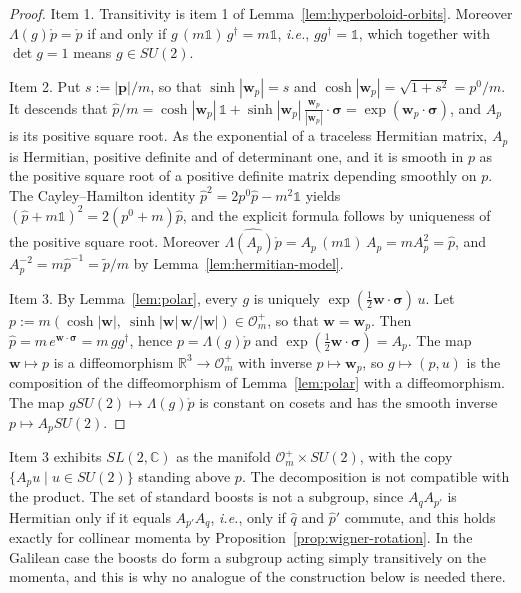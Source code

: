 \begin{proof}
	Item 1. Transitivity is item 1 of Lemma~\ref{lem:hyperboloid-orbits}. Moreover $\Lambda(g)\mathring{p}=\mathring{p}$ if and only if $g\,(m\mathbb{1})\,g^\dagger=m\mathbb{1}$, \textit{i.e.}, $gg^\dagger=\mathbb{1}$, which together with $\det g=1$ means $g\in SU(2)$.
	
	Item 2. Put $s:=|\mathbf{p}|/m$, so that $\sinh|\mathbf{w}_p|=s$ and $\cosh|\mathbf{w}_p|=\sqrt{1+s^2}=p^0/m$. It descends that $\hat{p}/m=\cosh|\mathbf{w}_p|\,\mathbb{1}+\sinh|\mathbf{w}_p|\,\tfrac{\mathbf{w}_p}{|\mathbf{w}_p|}\cdot\boldsymbol{\sigma}=\exp(\mathbf{w}_p\cdot\boldsymbol{\sigma})$, and $A_p$ is its positive square root. As the exponential of a traceless Hermitian matrix, $A_p$ is Hermitian, positive definite and of determinant one, and it is smooth in $p$ as the positive square root of a positive definite matrix depending smoothly on $p$. The Cayley--Hamilton identity $\hat{p}^2=2p^0\hat{p}-m^2\mathbb{1}$ yields $(\hat{p}+m\mathbb{1})^2=2(p^0+m)\hat{p}$, and the explicit formula follows by uniqueness of the positive square root. Moreover $\widehat{\Lambda(A_p)\mathring{p}}=A_p\,(m\mathbb{1})\,A_p=mA_p^2=\hat{p}$, and $A_p^{-2}=m\hat{p}^{-1}=\tilde{p}/m$ by Lemma~\ref{lem:hermitian-model}.
	
	Item 3. By Lemma~\ref{lem:polar}, every $g$ is uniquely $\exp(\tfrac12\mathbf{w}\cdot\boldsymbol{\sigma})\,u$. Let $p:=m(\cosh|\mathbf{w}|,\ \sinh|\mathbf{w}|\,\mathbf{w}/|\mathbf{w}|)\in\mathcal{O}_m^+$, so that $\mathbf{w}=\mathbf{w}_p$. Then $\hat{p}=m\,e^{\mathbf{w}\cdot\boldsymbol{\sigma}}=m\,gg^\dagger$, hence $p=\Lambda(g)\mathring{p}$ and $\exp(\tfrac12\mathbf{w}\cdot\boldsymbol{\sigma})=A_p$. The map $\mathbf{w}\mapsto p$ is a diffeomorphism $\mathbb{R}^3\to\mathcal{O}_m^+$ with inverse $p\mapsto\mathbf{w}_p$, so $g\mapsto(p,u)$ is the composition of the diffeomorphism of Lemma~\ref{lem:polar} with a diffeomorphism. The map $gSU(2)\mapsto\Lambda(g)\mathring{p}$ is constant on cosets and has the smooth inverse $p\mapsto A_pSU(2)$.
\end{proof}

\begin{remark}
	Item 3 exhibits $SL(2,\mathbb{C})$ as the manifold $\mathcal{O}_m^+\times SU(2)$, with the copy $\{A_pu\mid u\in SU(2)\}$ standing above $p$. The decomposition is not compatible with the product. The set of standard boosts is not a subgroup, since $A_qA_{p'}$ is Hermitian only if it equals $A_{p'}A_q$, \textit{i.e.}, only if $\hat{q}$ and $\hat{p}'$ commute, and this holds exactly for collinear momenta by Proposition~\ref{prop:wigner-rotation}. In the Galilean case the boosts do form a subgroup acting simply transitively on the momenta, and this is why no analogue of the construction below is needed there.
\end{remark}

